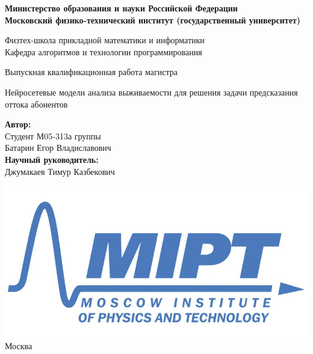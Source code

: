 \documentclass[a4paper,14pt,oneside,openany]{memoir}
\begin{document}
\begin{center}
	\large\textbf{Министерство образования и науки Российской Федерации \\
		Московский физико-технический институт (государственный
		университет)} \\
	\vspace{1cm}
	
	Физтех-школа прикладной математики и информатики \\
	
	Кафедра алгоритмов и технологии программирования \\
	
	
	\vspace{2em}
	
	Выпускная квалификационная работа магистра
\end{center}

\begin{center}
	\vspace{\fill}
	\LARGE{Нейросетевые модели анализа выживаемости для решения задачи предсказания оттока абонентов}
	
	\vspace{\fill}
\end{center}


\begin{flushright}
	\textbf{Автор:} \\
	Студент М05-313а группы \\
	Батарин Егор Владиславович \\
	\vspace{2em}
	\textbf{Научный руководитель:} \\
	Джумакаев Тимур Казбекович \\
	
\end{flushright}

\vspace{2em}

\begin{center}
	\includegraphics[width=100 pt]{../figures/MIPT_logo.jpg}\\
	Москва \the\year{}
\end{center}
\end{document}
